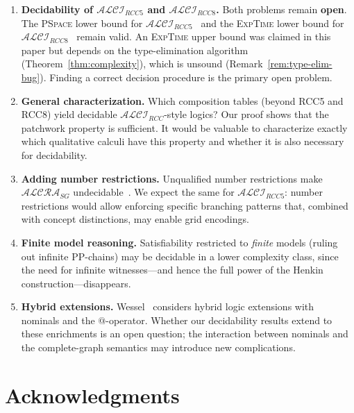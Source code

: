 \documentclass[a4paper,11pt]{article}
\theoremstyle{definition}
\newcommand{\ALCIRCC}[1]{\ensuremath{\mathcal{ALCI}_{\mathit{RCC#1}}}}
\newcommand{\ALCRASG}{\ensuremath{\mathcal{ALCRA}_{\mathit{SG}}}}
\newcommand{\EXPTIME}{\textsc{ExpTime}}
\newcommand{\PSPACE}{\textsc{PSpace}}
\begin{document}
\begin{enumerate}
  \item \textbf{Decidability of $\ALCIRCC{5}$ and $\ALCIRCC{8}$.}\;
    Both problems remain \textbf{open}.
    The \PSPACE{} lower bound for $\ALCIRCC{5}$~\cite{Wessel2003}
    and the \EXPTIME{} lower bound for $\ALCIRCC{8}$~\cite{Wessel2003}
    remain valid.  An \EXPTIME{} upper bound was claimed in this paper
    but depends on the type-elimination algorithm
    (Theorem~\ref{thm:complexity}), which is unsound
    (Remark~\ref{rem:type-elim-bug}).  Finding a correct decision
    procedure is the primary open problem.

  \item \textbf{General characterization.}\; Which composition tables
    (beyond RCC5 and RCC8) yield decidable $\ALCIRCC{}$-style logics?
    Our proof shows that the patchwork property is sufficient.  It
    would be valuable to characterize exactly which qualitative
    calculi have this property and whether it is also necessary for
    decidability.

  \item \textbf{Adding number restrictions.}\; Unqualified number
    restrictions make $\ALCRASG$ undecidable~\cite{Wessel2000}.  We
    expect the same for $\ALCIRCC{5}$: number restrictions would allow
    enforcing specific branching patterns that, combined with concept
    distinctions, may enable grid encodings.

  \item \textbf{Finite model reasoning.}\; Satisfiability restricted
    to \emph{finite} models (ruling out infinite PP-chains) may be
    decidable in a lower complexity class, since the need for infinite
    witnesses---and hence the full power of the Henkin
    construction---disappears.

  \item \textbf{Hybrid extensions.}\; Wessel~\cite{Wessel2003}
    considers hybrid logic extensions with nominals and the
    $\mathord{@}$-operator.  Whether our decidability results extend
    to these enrichments is an open question; the interaction between
    nominals and the complete-graph semantics may introduce new
    complications.
\end{enumerate}

\section*{Acknowledgments}
\end{document}
